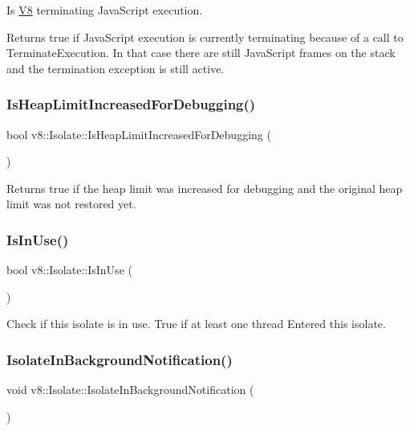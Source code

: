 Is \mbox{\hyperlink{classv8_1_1V8}{V8}} terminating Java\+Script execution.

Returns true if Java\+Script execution is currently terminating because of a call to Terminate\+Execution. In that case there are still Java\+Script frames on the stack and the termination exception is still active. \mbox{\label{classv8_1_1Isolate_a81a6c3e93cf6ec457a49d54f06eb0b44}} 
\subsubsection{\texorpdfstring{Is\+Heap\+Limit\+Increased\+For\+Debugging()}{IsHeapLimitIncreasedForDebugging()}}
{\footnotesize\ttfamily bool v8\+::\+Isolate\+::\+Is\+Heap\+Limit\+Increased\+For\+Debugging (\begin{DoxyParamCaption}{ }\end{DoxyParamCaption})}

Returns true if the heap limit was increased for debugging and the original heap limit was not restored yet. \mbox{\label{classv8_1_1Isolate_a961a5591bb2a3febda9e2974f21c4d15}} 
\subsubsection{\texorpdfstring{Is\+In\+Use()}{IsInUse()}}
{\footnotesize\ttfamily bool v8\+::\+Isolate\+::\+Is\+In\+Use (\begin{DoxyParamCaption}{ }\end{DoxyParamCaption})}

Check if this isolate is in use. True if at least one thread Enter\textquotesingle{}ed this isolate. \mbox{\label{classv8_1_1Isolate_a15c1ba9cdb3526a6439e7fddb292ee93}} 
\subsubsection{\texorpdfstring{Isolate\+In\+Background\+Notification()}{IsolateInBackgroundNotification()}}
{\footnotesize\ttfamily void v8\+::\+Isolate\+::\+Isolate\+In\+Background\+Notification (\begin{DoxyParamCaption}{ }\end{DoxyParamCaption})}

